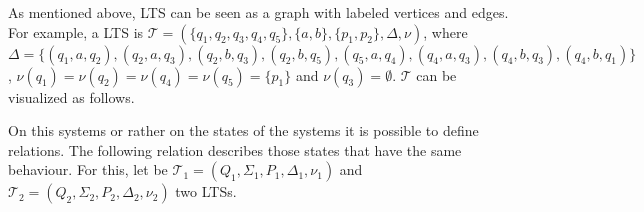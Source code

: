 \begin{example}
    \label{example:lts}
    As mentioned above, LTS can be seen as a graph with labeled vertices and edges. For example, a LTS is
    $\mathcal{T} = (\{q_1, q_2, q_3, q_4, q_5\}, \{a, b\}, \{p_1, p_2\}, \Delta, \nu)$, where $\Delta = \{(q_1, a, q_2)
    , (q_2, a, q_3), (q_2, b, q_3), (q_2, b, q_5), (q_5, a, q_4), (q_4, a, q_3), (q_4, b, q_3), (q_4, b, q_1)\}$,
    $\nu(q_1) = \nu(q_2) = \nu(q_4) = \nu(q_5) = \{p_1\}$ and $\nu(q_3) = \emptyset$. $\mathcal{T}$ can be visualized as
    follows.
\begin{center}
\end{center}
\end{example}

On this systems or rather on the states of the systems it is possible to define relations. The
following relation describes those states that have the same behaviour. For this, let be $\mathcal{T}_1 = (Q_1,
\Sigma_1, P_1, \Delta_1, \nu_1)$ and $\mathcal{T}_2 = (Q_2, \Sigma_2, P_2, \Delta_2, \nu_2)$ two LTSs.

